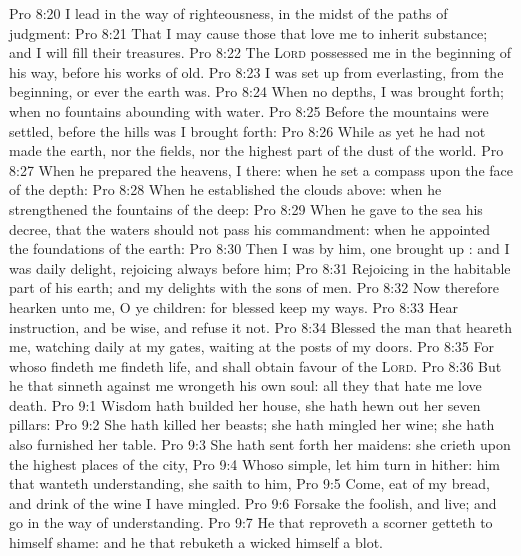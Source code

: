 \vs Pro 8:20 I lead in the way of righteousness, in the midst of the paths of judgment:
\vs Pro 8:21 That I may cause those that love me to inherit substance; and I will fill their treasures.
\vs Pro 8:22 The \textsc{Lord} possessed me in the beginning of his way, before his works of old.
\vs Pro 8:23 I was set up from everlasting, from the beginning, or ever the earth was.
\vs Pro 8:24 When  no depths, I was brought forth; when  no fountains abounding with water.
\vs Pro 8:25 Before the mountains were settled, before the hills was I brought forth:
\vs Pro 8:26 While as yet he had not made the earth, nor the fields, nor the highest part of the dust of the world.
\vs Pro 8:27 When he prepared the heavens, I  there: when he set a compass upon the face of the depth:
\vs Pro 8:28 When he established the clouds above: when he strengthened the fountains of the deep:
\vs Pro 8:29 When he gave to the sea his decree, that the waters should not pass his commandment: when he appointed the foundations of the earth:
\vs Pro 8:30 Then I was by him,  one brought up : and I was daily  delight, rejoicing always before him;
\vs Pro 8:31 Rejoicing in the habitable part of his earth; and my delights  with the sons of men.
\vs Pro 8:32 Now therefore hearken unto me, O ye children: for blessed  keep my ways.
\vs Pro 8:33 Hear instruction, and be wise, and refuse it not.
\vs Pro 8:34 Blessed  the man that heareth me, watching daily at my gates, waiting at the posts of my doors.
\vs Pro 8:35 For whoso findeth me findeth life, and shall obtain favour of the \textsc{Lord}.
\vs Pro 8:36 But he that sinneth against me wrongeth his own soul: all they that hate me love death.
\vs Pro 9:1 Wisdom hath builded her house, she hath hewn out her seven pillars:
\vs Pro 9:2 She hath killed her beasts; she hath mingled her wine; she hath also furnished her table.
\vs Pro 9:3 She hath sent forth her maidens: she crieth upon the highest places of the city,
\vs Pro 9:4 Whoso  simple, let him turn in hither:  him that wanteth understanding, she saith to him,
\vs Pro 9:5 Come, eat of my bread, and drink of the wine  I have mingled.
\vs Pro 9:6 Forsake the foolish, and live; and go in the way of understanding.
\vs Pro 9:7 He that reproveth a scorner getteth to himself shame: and he that rebuketh a wicked  himself a blot.
